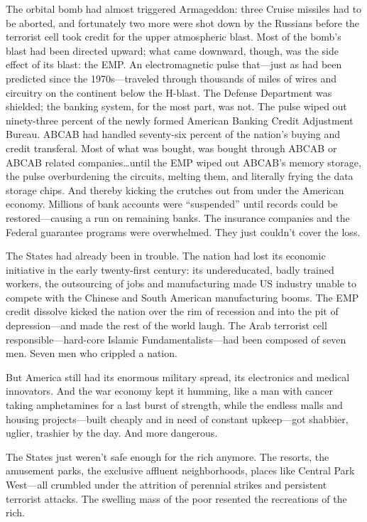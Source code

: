 The orbital bomb had almost triggered Armageddon: three Cruise missiles had to be aborted, and fortunately two more were shot down by the Russians before the terrorist cell took credit for the upper atmospheric blast. Most of the bomb's blast had been directed upward; what came downward, though, was the side effect of its blast: the EMP. An electromagnetic pulse that---just as had been predicted since the 1970s---traveled through thousands of miles of wires and circuitry on the continent below the H-blast. The Defense Department was shielded; the banking system, for the most part, was not. The pulse wiped out ninety-three percent of the newly formed American Banking Credit Adjustment Bureau. ABCAB had handled seventy-six percent of the nation's buying and credit transferal. Most of what was bought, was bought through ABCAB or ABCAB related companies\ldots until the EMP wiped out ABCAB's memory storage, the pulse overburdening the circuits, melting them, and literally frying the data storage chips. And thereby kicking the crutches out from under the American economy. Millions of bank accounts were ``suspended'' until records could be restored---causing a run on remaining banks. The insurance companies and the Federal guarantee programs were overwhelmed. They just couldn't cover the loss.

The States had already been in trouble. The nation had lost its economic initiative in the early twenty-first century: its undereducated, badly trained workers, the outsourcing of jobs and manufacturing made US industry unable to compete with the Chinese and South American manufacturing booms. The EMP credit dissolve kicked the nation over the rim of recession and into the pit of depression---and made the rest of the world laugh. The Arab terrorist cell responsible---hard-core Islamic Fundamentalists---had been composed of seven men. Seven men who crippled a nation.

But America still had its enormous military spread, its electronics and medical innovators. And the war economy kept it humming, like a man with cancer taking amphetamines for a last burst of strength, while the endless malls and housing projects---built cheaply and in need of constant upkeep---got shabbier, uglier, trashier by the day. And more dangerous.

The States just weren't safe enough for the rich anymore. The resorts, the amusement parks, the exclusive affluent neighborhoods, places like Central Park West---all crumbled under the attrition of perennial strikes and persistent terrorist attacks. The swelling mass of the poor resented the recreations of the rich.

